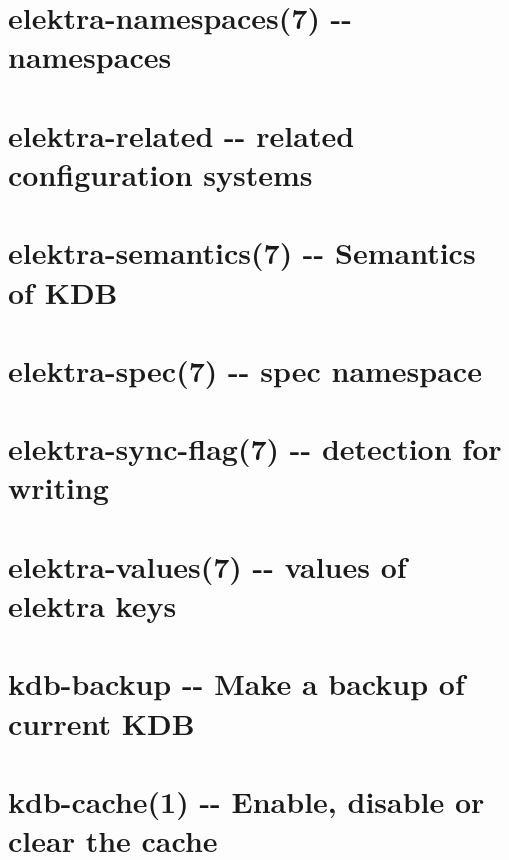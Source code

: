 \documentclass[twoside]{book}
\newcommand{\+}{\discretionary{\mbox{\scriptsize$\hookleftarrow$}}{}{}}
\begin{document}
\chapter{elektra-\/namespaces(7) -\/-\/ namespaces}
\label{doc_help_elektra-namespaces_md}

\chapter{elektra-\/related -\/-\/ related configuration systems}
\label{doc_help_elektra-related_md}

\chapter{elektra-\/semantics(7) -\/-\/ Semantics of K\+DB}
\label{doc_help_elektra-semantics_md}

\chapter{elektra-\/spec(7) -\/-\/ spec namespace}
\label{doc_help_elektra-spec_md}

\chapter{elektra-\/sync-\/flag(7) -\/-\/ detection for writing}
\label{doc_help_elektra-sync-flag_md}

\chapter{elektra-\/values(7) -\/-\/ values of elektra keys}
\label{doc_help_elektra-values_md}

\chapter{kdb-\/backup -\/-\/ Make a backup of current K\+DB}
\label{doc_help_kdb-backup_md}

\chapter{kdb-\/cache(1) -\/-\/ Enable, disable or clear the cache}
\label{doc_help_kdb-cache_md}

\end{document}
